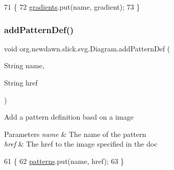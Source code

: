 \begin{DoxyCode}
71                                                             \{
72         \mbox{\hyperlink{classorg_1_1newdawn_1_1slick_1_1svg_1_1_diagram_acdc6103a0bc213559f53001de2c06548}{gradients}}.put(name, gradient);
73     \}
\end{DoxyCode}
\mbox{\label{classorg_1_1newdawn_1_1slick_1_1svg_1_1_diagram_a5c40fa781bb601e7d5590d81dd441661}} 
\subsubsection{\texorpdfstring{add\+Pattern\+Def()}{addPatternDef()}}
{\footnotesize\ttfamily void org.\+newdawn.\+slick.\+svg.\+Diagram.\+add\+Pattern\+Def (\begin{DoxyParamCaption}\item[{String}]{name,  }\item[{String}]{href }\end{DoxyParamCaption})\hspace{0.3cm}{\ttfamily [inline]}}

Add a pattern definition basd on a image


\begin{DoxyParams}{Parameters}
{\em name} & The name of the pattern \\
\hline
{\em href} & The href to the image specified in the doc \\
\hline
\end{DoxyParams}

\begin{DoxyCode}
61                                                         \{
62         \mbox{\hyperlink{classorg_1_1newdawn_1_1slick_1_1svg_1_1_diagram_ae97126aa813213972c4c755710ab13e6}{patterns}}.put(name, href);
63     \}
\end{DoxyCode}
\mbox{\label{classorg_1_1newdawn_1_1slick_1_1svg_1_1_diagram_aa331087982df2abf665a0b8bb7787118}} 
